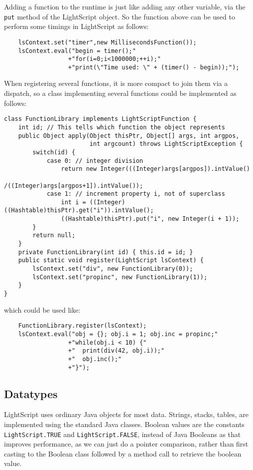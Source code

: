 \documentclass[11pt]{report}
\begin{document}
Adding a function to the runtime is just like adding any other variable,
via the \verb|put| method of the LightScript object.
So the function above can be used to perform some timings in LightScript as follows:
\begin{lstlisting}
    lsContext.set("timer",new MillisecondsFunction());
    lsContext.eval("begin = timer();"
                  +"for(i=0;i<1000000;++i);"
                  +"print(\"Time used: \" + (timer() - begin));");
\end{lstlisting}

When registering several functions, it is more compact to join them via a dispatch, 
so a class implementing several functions could be implemented as follows:
\begin{lstlisting}
class FunctionLibrary implements LightScriptFunction {
    int id; // This tells which function the object represents
    public Object apply(Object thisPtr, Object[] args, int argpos, 
                        int argcount) throws LightScriptException {
        switch(id) {
            case 0: // integer division
                return new Integer(((Integer)args[argpos]).intValue()
                                  /((Integer)args[argpos+1]).intValue());
            case 1: // increment property i, not of superclass
                int i = ((Integer)((Hashtable)thisPtr).get("i")).intValue();
                ((Hashtable)thisPtr).put("i", new Integer(i + 1));
        }
        return null;
    }
    private FunctionLibrary(int id) { this.id = id; }
    public static void register(LightScript lsContext) {
        lsContext.set("div", new FunctionLibrary(0));
        lsContext.set("propinc", new FunctionLibrary(1));
    }
}
\end{lstlisting}
which could be used like:
\begin{lstlisting}
    FunctionLibrary.register(lsContext);
    lsContext.eval("obj = {}; obj.i = 1; obj.inc = propinc;"
                  +"while(obj.i < 10) {"
                  +"  print(div(42, obj.i));"
                  +"  obj.inc();"
                  +"}");
\end{lstlisting}

\subsection{Datatypes}
LightScript uses ordinary Java objects for most data.
Strings, stacks, tables, are implemented using the standard Java classes.
Boolean values are the constants \verb|LightScript.TRUE| and \verb|LightScript.FALSE|, instead of Java Booleans as that improves performance, as we can just do a pointer comparison, rather than first casting to the Boolean class followed by a method call to retrieve the boolean value.
\end{document}
